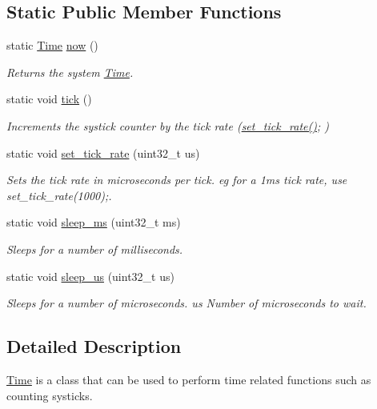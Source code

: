 \subsection*{Static Public Member Functions}
\begin{DoxyCompactItemize}
\item 
static \hyperlink{classetk_1_1_time}{Time} \hyperlink{classetk_1_1_time_a62994c716032a82f6a468edeae96b804}{now} ()
\begin{DoxyCompactList}\small\item\em Returns the system \hyperlink{classetk_1_1_time}{Time}. \end{DoxyCompactList}\item 
static void \hyperlink{classetk_1_1_time_a50cd20d8fe513b514e61291828febf92}{tick} ()
\begin{DoxyCompactList}\small\item\em Increments the systick counter by the tick rate (\hyperlink{classetk_1_1_time_a68bf929bd88a5c56794c4a3e6b0dbfeb}{set\-\_\-tick\-\_\-rate()}; ) \end{DoxyCompactList}\item 
static void \hyperlink{classetk_1_1_time_a68bf929bd88a5c56794c4a3e6b0dbfeb}{set\-\_\-tick\-\_\-rate} (uint32\-\_\-t us)
\begin{DoxyCompactList}\small\item\em Sets the tick rate in microseconds per tick. eg for a 1ms tick rate, use set\-\_\-tick\-\_\-rate(1000);. \end{DoxyCompactList}\item 
static void \hyperlink{classetk_1_1_time_a166f875a8ceb4e5f47ad5bc274f2d668}{sleep\-\_\-ms} (uint32\-\_\-t ms)
\begin{DoxyCompactList}\small\item\em Sleeps for a number of milliseconds. \end{DoxyCompactList}\item 
static void \hyperlink{classetk_1_1_time_a51255bc2bd5b357391d0a785ed90b3ca}{sleep\-\_\-us} (uint32\-\_\-t us)
\begin{DoxyCompactList}\small\item\em Sleeps for a number of microseconds.  us Number of microseconds to wait. \end{DoxyCompactList}\end{DoxyCompactItemize}


\subsection{Detailed Description}
\hyperlink{classetk_1_1_time}{Time} is a class that can be used to perform time related functions such as counting systicks. 

